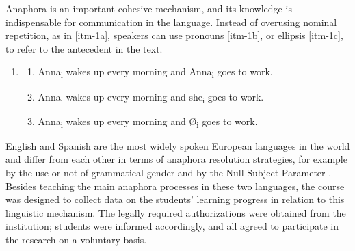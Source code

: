 \documentclass{textolivre}
\begin{document}
Anaphora is an important cohesive mechanism, and its knowledge is indispensable
for communication in the language. Instead of overusing nominal repetition, as
in \ref{itm-1a}, speakers can use pronouns \ref{itm-1b}, or ellipsis \ref{itm-1c}, to refer to the
antecedent in the text.

%
%
\begin{enumerate}[wide,label=(\arabic*),topsep=1ex,partopsep=1ex,leftmargin=0.15cm,noitemsep]
\setlength{\itemindent}{0em}
\item[]{} \addtocounter{enumi}{1} %
\begin{enumerate}[wide,label=(\arabic{enumi}\alph*),topsep=1ex,partopsep=1ex,noitemsep]
\setlength{\itemindent}{0em}
\item \label{itm-1a} Anna\textsubscript{i} wakes up every morning and Anna\textsubscript{i} goes to work.
\item \label{itm-1b} Anna\textsubscript{i} wakes up every morning and she\textsubscript{i} goes to work.
\item \label{itm-1c} Anna\textsubscript{i} wakes up every morning and Ø\textsubscript{i} goes to work.
\end{enumerate}
\end{enumerate}


English and Spanish are the most widely spoken European languages in the world
\cite{eberhard_ethnologue:_2020} and differ from each other in terms of
anaphora resolution strategies, for example by the use or not of grammatical
gender and by the Null Subject Parameter \cite{chomsky_lectures_1981,rizzi_issues_1982}. Besides
teaching the main anaphora processes in these two languages, the course was
designed to collect data on the students' learning progress in relation to this
linguistic mechanism. The legally required authorizations were obtained from
the institution; students were informed accordingly, and all agreed to
participate in the research on a voluntary basis.
\end{document}

